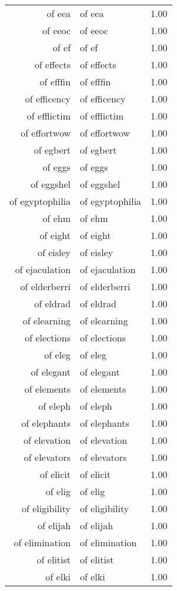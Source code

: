 \begin{table}[ht]
\begin{tabular}{rlr}
  of eea & of eea & 1.00 \\ 
  of eeoc & of eeoc & 1.00 \\ 
  of ef & of ef & 1.00 \\ 
  of effects & of effects & 1.00 \\ 
  of efffin & of efffin & 1.00 \\ 
  of efficency & of efficency & 1.00 \\ 
  of efflictim & of efflictim & 1.00 \\ 
  of effortwow & of effortwow & 1.00 \\ 
  of egbert & of egbert & 1.00 \\ 
  of eggs & of eggs & 1.00 \\ 
  of eggshel & of eggshel & 1.00 \\ 
  of egyptophilia & of egyptophilia & 1.00 \\ 
  of ehm & of ehm & 1.00 \\ 
  of eight & of eight & 1.00 \\ 
  of eisley & of eisley & 1.00 \\ 
  of ejaculation & of ejaculation & 1.00 \\ 
  of elderberri & of elderberri & 1.00 \\ 
  of eldrad & of eldrad & 1.00 \\ 
  of elearning & of elearning & 1.00 \\ 
  of elections & of elections & 1.00 \\ 
  of eleg & of eleg & 1.00 \\ 
  of elegant & of elegant & 1.00 \\ 
  of elements & of elements & 1.00 \\ 
  of eleph & of eleph & 1.00 \\ 
  of elephants & of elephants & 1.00 \\ 
  of elevation & of elevation & 1.00 \\ 
  of elevators & of elevators & 1.00 \\ 
  of elicit & of elicit & 1.00 \\ 
  of elig & of elig & 1.00 \\ 
  of eligibility & of eligibility & 1.00 \\ 
  of elijah & of elijah & 1.00 \\ 
  of elimination & of elimination & 1.00 \\ 
  of elitist & of elitist & 1.00 \\ 
  of elki & of elki & 1.00 \\ 

\end{tabular}
\end{table}
